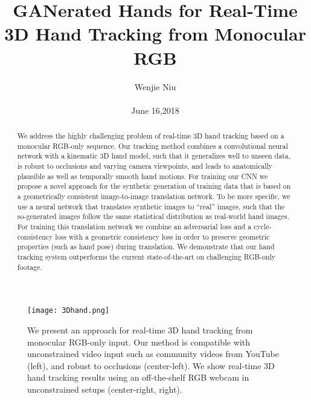 \documentclass[10pt,twocolumn,letterpaper]{article}
\begin{document}
\title{GANerated Hands for Real-Time 3D Hand Tracking from Monocular RGB}

\author{Wenjie Niu\\\\ June 16,2018}

\maketitle

\begin{abstract}
We address the highly challenging problem of real-time
3D hand tracking based on a monocular RGB-only sequence.
Our tracking method combines a convolutional
neural network with a kinematic 3D hand model, such that it
generalizes well to unseen data, is robust to occlusions and
varying camera viewpoints, and leads to anatomically plausible
as well as temporally smooth hand motions. For training
our CNN we propose a novel approach for the synthetic
generation of training data that is based on a geometrically
consistent image-to-image translation network. To be more
specific, we use a neural network that translates synthetic
images to “real” images, such that the so-generated images
follow the same statistical distribution as real-world
hand images. For training this translation network we combine
an adversarial loss and a cycle-consistency loss with
a geometric consistency loss in order to preserve geometric
properties (such as hand pose) during translation. We
demonstrate that our hand tracking system outperforms the
current state-of-the-art on challenging RGB-only footage.\cite{Mueller_2018_CVPR}\par
\end{abstract}

\begin{figure*}
\begin{center}
   \texttt{[image: 3Dhand.png]}
\end{center}
   \caption{ We present an approach for real-time 3D hand tracking from monocular RGB-only input. Our method is compatible
with unconstrained video input such as community videos from YouTube (left), and robust to occlusions (center-left). We
show real-time 3D hand tracking results using an off-the-shelf RGB webcam in unconstrained setups (center-right, right).}
\label{fig:hand}
\end{figure*}

\end{document}
